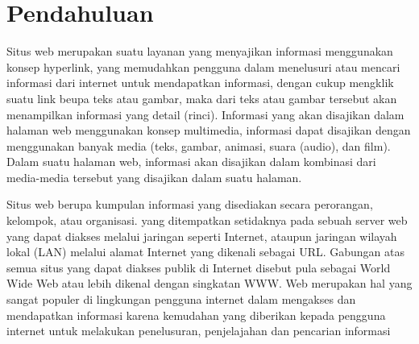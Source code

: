 \section{Pendahuluan}
	Situs web merupakan suatu layanan yang menyajikan informasi menggunakan konsep hyperlink, yang memudahkan pengguna dalam menelusuri atau mencari informasi dari internet untuk mendapatkan informasi, dengan cukup mengklik suatu link beupa teks atau gambar, maka dari teks atau gambar tersebut akan menampilkan informasi yang detail (rinci).
Informasi yang akan disajikan dalam halaman web menggunakan konsep multimedia, informasi dapat disajikan dengan menggunakan banyak media (teks, gambar, animasi, suara (audio), dan film). Dalam suatu halaman web, informasi akan disajikan dalam kombinasi dari media-media tersebut yang disajikan dalam suatu halaman.

Situs web berupa kumpulan informasi yang disediakan secara perorangan, kelompok, atau organisasi. yang ditempatkan setidaknya pada sebuah server web yang dapat diakses melalui jaringan seperti Internet, ataupun jaringan wilayah lokal (LAN) melalui alamat Internet yang dikenali sebagai URL. Gabungan atas semua situs yang dapat diakses publik di Internet disebut pula sebagai World Wide Web atau lebih dikenal dengan singkatan WWW. Web merupakan hal yang sangat populer di lingkungan pengguna internet dalam mengakses dan mendapatkan informasi karena kemudahan yang diberikan kepada pengguna internet untuk melakukan penelusuran, penjelajahan dan pencarian informasi   
